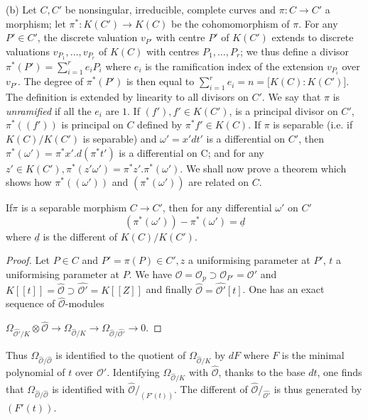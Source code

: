 (b) Let $C,C'$ be nonsingular, irreducible, complete curves and $\pi :
C \rightarrow C'$ a morphism; let $\pi^* : K(C')\rightarrow K(C)$ be
the cohomomorphism of $\pi$. For any $P' \in  C'$, the discrete
valuation $v_{ P'}$ with centre $P'$ of $K(C')$ extends to discrete
valuations $v_{P_1} ,\ldots , v_{P_r}$ of $K(C)$ with centres $P_1 ,
\ldots , P_r $; we thus define a divisor $\pi^*(P') =
\sum\limits_{i=1}^{r} e_i P_i$ where $e_ i$ is the ramification index
of the extension $v_{P_i}$ over $v_{P'}$. The degree of $\pi^*(P')$ is
then equal to $\sum\limits_{i=1}^r e_i = n = \big[K(C) :
  K(C')\big]$. The definition is extended by linearity to all divisors
on $C'$. We say that $\pi$ is \textit{unramified} if all the $e_i$ are
$1$. If $(f'), f' \in  K(C')$, is a principal divisor on $C'$,
$\pi^*((f'))$ is principal on $C$ defined by $ \pi^* f' \in K (C)$. If
$\pi$ is separable (i.e. if $K(C)/K(C')$ is separable) and $\omega'
=x' dt'$ is a differential on $C'$, then $\pi^*(\omega')=\pi^*{ x'
  .d(\pi^*t')}$ is a differential on C; and for any $z' \in K(C'),
{\pi^*(z'\omega')=\pi^*z'. \pi^*(\omega').}$ We shall now prove a
theorem which shows how $\pi^*((\omega'))$ and $(\pi^*(\omega'))$ are
related on $C$. 

\begin{theorem*}%
  If\pageoriginale $\pi$ is a separable morphism $C \rightarrow C'$, then for any
  differential $\omega'$ on $C'$ 
  $$ 
  (\pi^\ast (\omega')) - \pi^\ast (\omega') = \underline{d} 
  $$
  where $\underline{d}$ is the different of $K(C)/{K(C')}$.
\end{theorem*}

\begin{proof}%
  Let $P \in C$ and $P'= \pi(P)\in C', z$ a uniformising parameter at
  $P'$, $t$ a uniformising parameter at $P$. We have $\mathscr{O}=
  \mathscr{O}_{ p} { \supset \mathscr{O}_{P'}}=\mathscr{O'}$ and
  $K[[t]] = \hat{\mathscr{O}} \supset \hat{\mathscr{O'}} = K[[Z]]$ and
  finally $\widehat{\mathscr{O}} = \widehat{\mathscr{O'}} [t]$. One
  has an exact sequence of $\hat{\mathscr{O}}$-modules 
  
  $\Omega_{\hat{\mathscr{O'}}/{ K}}\otimes \hat{\mathscr{O}}
  \rightarrow \Omega_{\hat{\mathscr{O}}/ K} \rightarrow
  \Omega_{\hat{\mathscr{O}}/\hat{\mathscr{O'}}}\rightarrow 0$. 
\end{proof}

Thus $\Omega_{\hat{\mathscr{O}}/\hat{\mathscr{O}}}$  is identified
to the quotient of $\Omega_{\hat{\mathscr{O}}/ K}$ by $dF$ where
$F$ is the minimal polynomial of $t$ over $\mathscr{O}'$. Identifying
$\Omega_{\hat{\mathscr{O}}/K}$ with
$\hat{\mathscr{O}}$, thanks to the base $dt$, one finds that
$\Omega_{\hat{\mathscr{O}}/\hat{\mathscr{O}}}$ is identified with
$\hat{\mathscr{O}}/_{(F'(t))}$. The different of $\hat{\mathscr{O}}
/_{\hat{\mathscr{O}'}}$ is thus generated by $(F'(t))$. 
		
